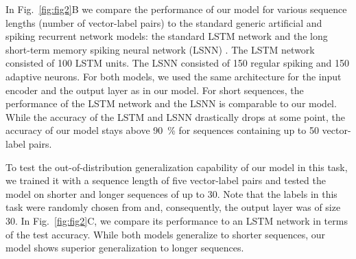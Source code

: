 \documentclass{article}
\begin{document}
In Fig.~\ref{fig:fig2}B we compare the performance of our model for various sequence lengths (number of vector-label pairs) to the standard generic artificial and spiking recurrent network models: the standard LSTM network \cite{hochreiter1997long} and the long short-term memory spiking neural network (LSNN) \cite{bellec2018long,salaj2021spike}. The LSTM network consisted of \num{100} LSTM units. The LSNN consisted of \num{150} regular spiking and \num{150} adaptive neurons. For both models, we used the same architecture for the input encoder and the output layer as in our model. For short sequences, the performance of the LSTM network and the LSNN is comparable to our model. While the accuracy of the LSTM and LSNN drastically drops at some point, the accuracy of our model stays above \SI{90}{\percent} for sequences containing up to \num{50} vector-label pairs.

To test the out-of-distribution generalization capability of our model in this task, we trained it with a sequence length  of five vector-label pairs and tested the model on shorter and longer sequences of up to \num{30}. Note that the labels in this task were randomly chosen from  and, consequently, the output layer was of size \num{30}. In Fig.~\ref{fig:fig2}C, we compare its performance to an LSTM network in terms of the test accuracy. While both models generalize to shorter sequences, our model shows superior generalization to longer sequences.
\end{document}
